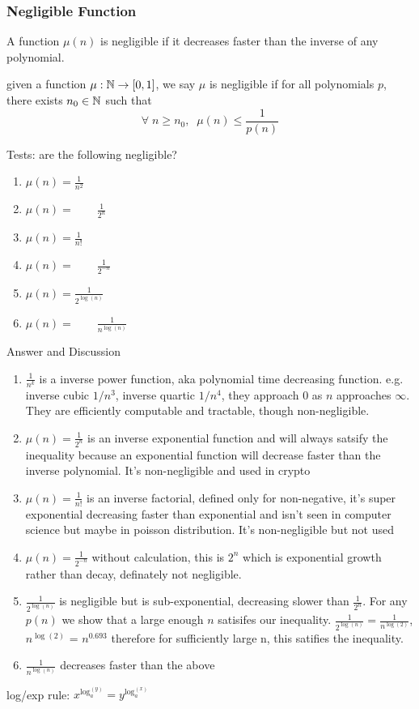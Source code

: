 \subsubsection*{Negligible Function}
A function $\mu(n)$ is negligible if it decreases faster than the inverse of any polynomial.
\begin{definition}
    given a function $\mu : \mathbb{N} \to [0,1]$, we say $\mu$ is negligible if for all polynomials $p$, there exists $n_0 \in \mathbb{N}$ such that 
$$
    \forall \; n \geq n_0,\;   \; \mu(n) \leq \frac{1}{p(n)}
$$
\end{definition}
Tests: are the following negligible?
\begin{enumerate}
    \item $\mu(n) = \frac{1}{n^2}$
    \item $\mu(n) = \qquad \frac{1}{2^n}$ 
    \item $\mu(n) = \frac{1}{n!}$ 
    \item $\mu(n) = \qquad \frac{1}{2^{-n}}$ 
    \item $\mu(n) = \frac{1}{2^{\log(n)}}$ 
    \item $\mu(n) = \qquad \frac{1}{n^{\log(n)}}$ 
\end{enumerate}

Answer and Discussion
\begin{enumerate}
    \item $\frac{1}{n^k}$ is a inverse power function, aka polynomial time decreasing function. e.g. inverse cubic $1/n^3$, inverse quartic $1/n^4$, they approach 0 as $n$ approaches $\infty$. They are efficiently computable and tractable, though non-negligible. \\
    \item $\mu(n) = \frac{1}{2^n}$ is an inverse exponential function and will always satsify the inequality because an exponential function will decrease faster than the inverse polynomial.  It's non-negligible and used in crypto\\
    \item $\mu(n) = \frac{1}{n!}$ is an inverse factorial, defined only for non-negative, it's super exponential decreasing faster than exponential and isn't seen in computer science but maybe in poisson distribution. It's non-negligible but not used \\
    \item $\mu(n) = \frac{1}{2^{-n}}$ without calculation, this is $2^n$ which is exponential growth rather than decay, definately not negligible. \\
    \item $\frac{1}{2^{\log(n)}}$ is negligible but is sub-exponential, decreasing slower than $\frac{1}{2^n}$. For any $p(n)$ we show that a large enough $n$ satisifes our inequality. $\frac{1}{2^{\log(n)}} = \frac{1}{n^{\log(2)}}$, $n^{\log(2)}$ = $n^{0.693}$ therefore for sufficiently large n, this satifies the inequality. \\
    \item $\frac{1}{n^{\log(n)}}$ decreases faster than the above
\end{enumerate}
log/exp rule: $x^{\log_a^{(y)}} = y^{\log_a^{(x)}}$





